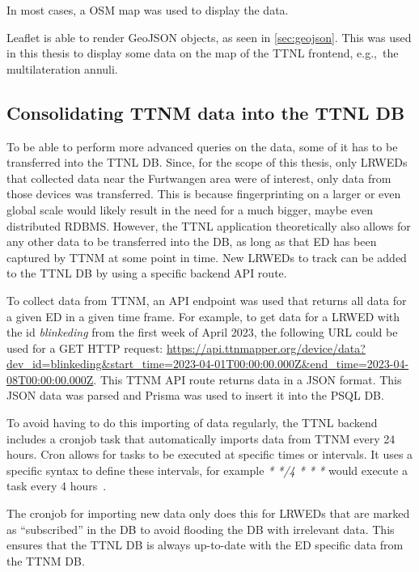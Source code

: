 In most cases, a \ac{OSM} map was used to display the data.

Leaflet is able to render GeoJSON objects, as seen in \cref{sec:geojson}.
This was used in this thesis to display some data on the map of the \ac{TTNL} frontend, e.g.,\ the multilateration annuli.

\subsection{Consolidating \acl{TTNM} data into the \acl{TTNL} \acl{DB}}\label{sec:consolidating-ttnm-data-into-ttnl-db}

To be able to perform more advanced queries on the data, some of it has to be transferred into the \ac{TTNL} \acl{DB}.
Since, for the scope of this thesis, only \aclp{LRWED} that collected data near the Furtwangen area were of interest, only data from those devices was transferred.
This is because fingerprinting on a larger or even global scale would likely result in the need for a much bigger, maybe even distributed \ac{RDBMS}.
However, the \ac{TTNL} application theoretically also allows for any other data to be transferred into the \ac{DB}, as long as that \acl{ED} has been captured by \ac{TTNM} at some point in time.
New \aclp{LRWED} to track can be added to the \ac{TTNL} \ac{DB} by using a specific backend \ac{API} route.

To collect data from \ac{TTNM}, an \ac{API} endpoint was used that returns all data for a given \acl{ED} in a given time frame.
For example, to get data for a \acl{LRWED} with the id \emph{blinkeding} from the first week of April 2023, the following \ac{URL} could be used for a GET \ac{HTTP} request: \url{https://api.ttnmapper.org/device/data?dev_id=blinkeding&start_time=2023-04-01T00:00:00.000Z&end_time=2023-04-08T00:00:00.000Z}.
This \ac{TTNM} \ac{API} route returns data in a \ac{JSON} format.
This \ac{JSON} data was parsed and Prisma was used to insert it into the \ac{PSQL} \ac{DB}.

To avoid having to do this importing of data regularly, the \ac{TTNL} backend includes a cronjob task that automatically imports data from \ac{TTNM} every 24 hours.
Cron allows for tasks to be executed at specific times or intervals.
It uses a specific syntax to define these intervals, for example \emph{* */4 * * *} would execute a task every 4 hours~\cite{drake_how_2020}.

The cronjob for importing new data only does this for \aclp{LRWED} that are marked as ``subscribed'' in the \ac{DB} to avoid flooding the \ac{DB} with irrelevant data.
This ensures that the \ac{TTNL} \ac{DB} is always up-to-date with the \acl{ED} specific data from the \ac{TTNM} \ac{DB}.

